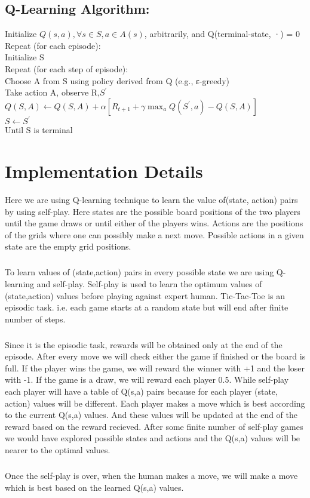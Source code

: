 \documentclass[a4paper, 12pt, notitlepage]{report}
\begin{document}
\subsection{Q-Learning Algorithm:}
Initialize $Q(s,a), \forall s \in S, a \in A(s)$, arbitrarily, and Q(terminal-state, ·) = 0 \\
Repeat (for each episode):\\
\hspace*{3ex}Initialize S\\
\hspace*{3ex}Repeat (for each step of episode):\\
\hspace*{6ex}Choose A from S using policy derived from Q (e.g., ε-greedy)\\
\hspace*{6ex}Take action A, observe R,$S^{'}$ \\
\hspace*{6ex}$ Q(S,A)\leftarrow Q(S,A)+\alpha[R_{t+1}+ \gamma \max_{a} Q(S^{'},a)-Q(S,A)] $\\
\hspace*{6ex}$S \leftarrow S^{'}$\\
\hspace*{3ex}Until S is terminal	
%

\section{Implementation Details}
Here we are using Q-learning technique to learn the value of(state, action) pairs by using self-play. Here states are the possible board positions of the two players until the game draws or until either of the players wins. Actions are the positions of the grids where one can possibly make a next move. Possible actions in a given state are the empty grid positions.
\subparagraph*{}
To learn values of (state,action) pairs in every possible state we are using Q-learning and self-play. Self-play is used to learn the optimum values of (state,action) values before playing against expert human. Tic-Tac-Toe is an episodic task. i.e. each game starts at a random state but will end after finite number of steps.
\subparagraph*{} 
Since it is the episodic task, rewards will be obtained only at the end of the episode. After every move we will check either the game if finished or the board is full. If the player wins the game, we will reward the winner with +1 and the loser with -1. If the game is a draw, we will reward each player 0.5. While self-play each player will have a table of Q(s,a) pairs because for each player (state, action) values will be different. Each player makes a move which is best according to the current Q(s,a) values. And these values will be updated at the end of the reward based on the reward recieved. After some finite number of self-play games we would have explored possible states and actions and the Q(s,a) values will be nearer to the optimal values.
\subparagraph*{}
Once the self-play is over, when the human makes a move, we will make a move which is best based on the learned Q(s,a) values. 
\end{document}
